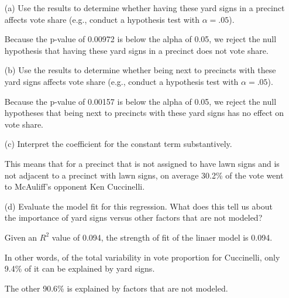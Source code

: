 \documentclass[12pt,letterpaper]{article}
\begin{document}
\vspace{.1cm}
\begin{enumerate}
	\item [(a)] Use the results to determine whether having these yard signs in a precinct affects vote share (e.g., conduct a hypothesis test with $\alpha = .05$).
	
	
	
	Because the p-value of 0.00972 is below the alpha of 0.05, we reject the null hypothesis that having these yard signs in a precinct does not vote share.
	
	\newpage		
	\item [(b)]  Use the results to determine whether being
	next to precincts with these yard signs affects vote
	share (e.g., conduct a hypothesis test with $\alpha = .05$).
	
	
	
	Because the p-value of 0.00157 is below the alpha of 0.05, we reject the null hypotheses that being next to precincts with these yard signs has no effect on vote share.
	
	\vspace{.7cm}
	\item [(c)] Interpret the coefficient for the constant term substantively.
	
	This means that for a precinct that is not assigned to have lawn signs and is not adjacent to a precinct with lawn signs, on average 30.2\% of the vote went to McAuliff's opponent Ken Cuccinelli.
	
	\vspace{.7cm}
	
	\item [(d)] Evaluate the model fit for this regression.  What does this	tell us about the importance of yard signs versus other factors that are not modeled?
	
	Given an $R^2$ value of 0.094, the strength of fit of the linaer model is 0.094.
	
	In other words, of the total variability in vote proportion for Cuccinelli, only 9.4\% of it can be explained by yard signs.
	
	The other 90.6\% is explained by factors that are not modeled.
	
	
\end{enumerate}  

\newpage
\end{document}
